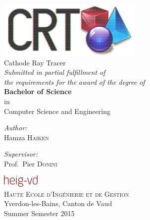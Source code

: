 \documentclass[a4paper, twocolumn, 10pt]{report}
\begin{document}
\begin{titlepage}
\begin{center}

~\\[5cm]
\includegraphics[width=7cm]{../res/logo/logo.png}~\\[0.5cm]

{\sc \huge Cathode Ray Tracer } \\[2cm]
{\large \em Submitted in partial fulfillment of\\the requirements for the award of the degree of}\\[0.5cm]
{ \large {\bfseries Bachelor of Science} \\in\\Computer Science and Engineering }\\[2cm]

\noindent

\begin{minipage}{0.25\textwidth}
  \begin{flushleft} \large
    \emph{Author:}\\
    Hamza \textsc{Haiken}
  \end{flushleft}
\end{minipage}%
\begin{minipage}{0.25\textwidth}
  \begin{flushright} \large
    \emph{Supervisor:}\\
    Prof.~Pier \textsc{Donini}
  \end{flushright}
\end{minipage}

\vfill


\includegraphics[height=0.6cm]{img/heig-vd.png}\\[0.4cm]
\textsc{\Large Haute Ecole d'Ingénierie et de Gestion}\\[0.4cm]
{ \large Yverdon-les-Bains, Canton de Vaud}\\[0.8cm]
{ \Large Summer Semester 2015}

\end{center}
\end{titlepage}
\end{document}
